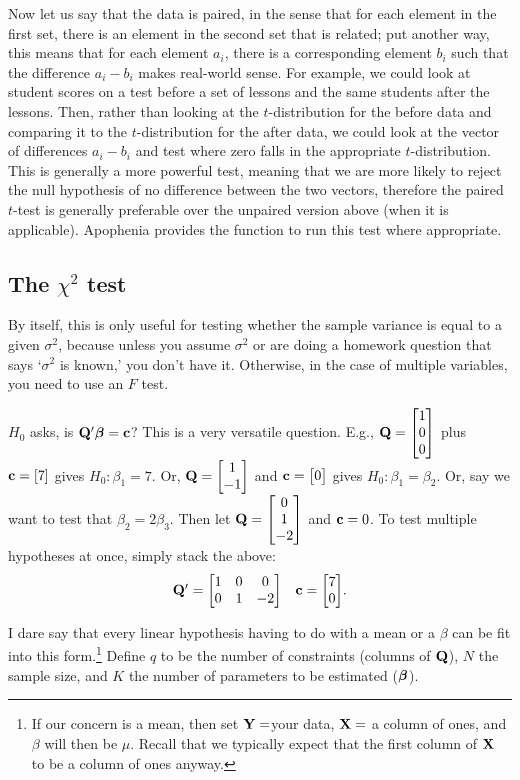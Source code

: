 Now let us say that the data is paired, in the sense that for each
element in the first set, there is an element in the second set that is
related; put another way, this means that for each element $a_i$, there
is a corresponding element $b_i$ such that the difference $a_i - b_i$
makes real-world sense. For example, we could look at student scores on
a test before a set of lessons and the same students after the lessons.
Then, rather than looking at the $t$-distribution for the before data
and comparing it to the $t$-distribution for the after data, we could
look at the vector of differences $a_i - b_i$ and test where zero falls
in the appropriate $t$-distribution. This is generally a more powerful test,
meaning that we are more likely to reject the null hypothesis of no
difference between the two vectors, therefore the paired $t$-test is
generally preferable over the unpaired version above (when it is
applicable). Apophenia provides the 
function to run this test where appropriate.

\subsection{The $\chi^2$ test}

By itself, this is only useful for testing whether the sample variance
is equal to a given $\sigma^2$, because unless you assume $\sigma^2$ 
or are doing a homework question that says `$\sigma^2$
is known,' you don't have it. Otherwise, in the case of multiple variables, you need to use
an $F$ test.

$H_0$ asks, is ${{\bf Q}'
{\mbox{\boldmath$\beta$}}} = {\bf c}$?  This is a very versatile question. E.g., ${\bf Q} =
\left[\begin{matrix}1\cr 0\cr 0\end{matrix}\right]$ plus ${\bf c} = [7]$ gives $H_0: \beta_1 = 7$. Or, ${\bf Q} = \left[\begin{matrix}1 \cr
-1\end{matrix}\right]$ and ${\bf c} = \left[\begin{matrix}0\end{matrix}\right]$ gives $H_0: \beta_1=\beta_2$. 
Or, say we want to test that $\beta_2 = 2\beta_3$. Then let ${\bf Q}=\left[\begin{matrix}0 \cr 1 \cr -2\end{matrix}\right]$ and ${\bf c} = 0$.
To test multiple hypotheses at once, simply stack the above:
\begin{equation}
\begin{matrix}{\bf Q}' = \left[\begin{matrix}1 & 0 & 0  \cr
                0 &1 &-2\end{matrix}\right] 
                & {\bf c} = \left[\begin{matrix}7 \cr 0\end{matrix}\right]\end{matrix}.\label{qc}\end{equation}

I dare
say that every linear hypothesis having to do with a mean or a $\beta$ can be
fit into this form.\footnote{If our concern is a mean, then set
${\bf Y}=$your data, ${\bf X}=$ a column of ones, and $\beta$ will then be
$\mu$. Recall that we typically expect that the first column of ${\bf X}$ to
be a column of ones anyway.}
Define $q$ to be the number of constraints (columns
of ${\bf Q}$), $N$ the sample size, and $K$ the number of parameters to be
estimated (${\mbox{\boldmath$\beta$}}$).

